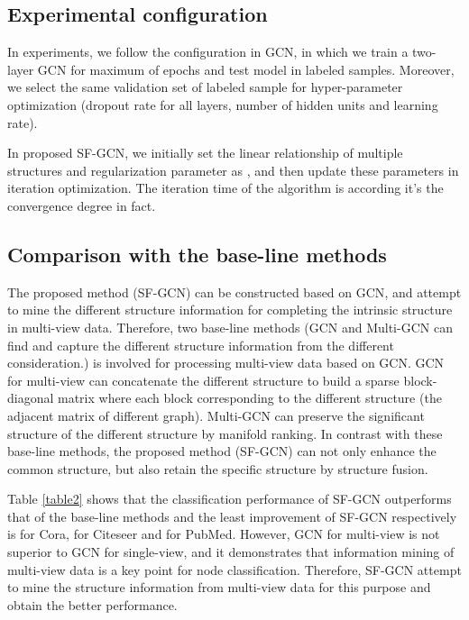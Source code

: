 \documentclass[review]{elsarticle}
\begin{document}
\subsection{Experimental configuration}
In experiments, we follow the configuration in GCN\cite{kipf2016semi}, in which we train a two-layer GCN for maximum of  epochs and test model in  labeled samples. Moreover, we select the same validation set of  labeled sample for hyper-parameter optimization (dropout rate for all layers, number of hidden units and learning rate).

In proposed SF-GCN, we initially set the linear relationship  of multiple structures and regularization parameter  as , and then update these parameters in iteration optimization. The iteration time  of the algorithm is  according it's the convergence degree in fact.

\subsection{Comparison with the base-line methods}
\label{baseline}
The proposed method (SF-GCN) can be constructed based on GCN\cite{kipf2016semi}, and attempt to mine the different structure information for completing the intrinsic structure in multi-view data. Therefore, two base-line methods (GCN and Multi-GCN can find and capture the different structure information from the different consideration.) is involved for processing multi-view data based on GCN. GCN for multi-view\cite{kipf2016semi} can concatenate the different structure to build a sparse block-diagonal matrix where each block corresponding to the different structure (the adjacent matrix of different graph). Multi-GCN \cite{khan2019multi} can preserve the significant structure of the different structure by manifold ranking. In contrast with these base-line methods, the proposed method (SF-GCN) can not only enhance the common structure, but also retain the specific structure by structure fusion.

Table \ref{table2} shows that the classification performance of SF-GCN outperforms that of the base-line methods and the least improvement of SF-GCN respectively is  for Cora,  for Citeseer and  for PubMed. However, GCN for multi-view is not superior to GCN for single-view, and it demonstrates that information mining of multi-view data is a key point for node classification. Therefore, SF-GCN attempt to mine the structure information from multi-view data for this purpose and obtain the better performance.
\end{document}
